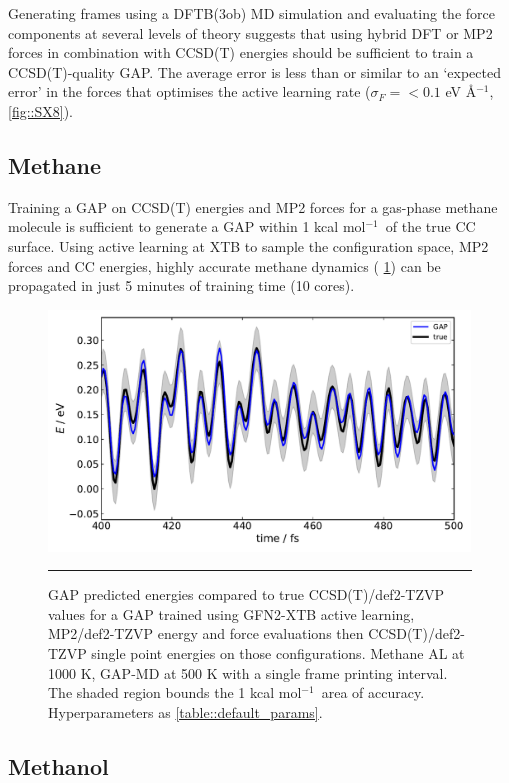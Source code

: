 \documentclass[11pt]{article}
\numberwithin{equation}{subsection}
\newcommand{\kcal}{kcal mol$^{-1}$}
\begin{document}
Generating frames using a DFTB(3ob) MD simulation and evaluating the force components at several levels of theory  suggests that using hybrid DFT or MP2 forces in combination with CCSD(T) energies should be sufficient to train a CCSD(T)-quality GAP. The average error is less than or similar to an `expected error' in the forces that optimises the active learning rate ($\sigma_F = <0.1$ eV \AA${}^{-1}$, \figurename{ \ref{fig::SX8}}). 


\subsection{Methane}
Training a GAP on CCSD(T) energies and MP2 forces for a gas-phase methane molecule is sufficient to generate a GAP within 1 \kcal~of the true CC surface. Using active learning at XTB to sample the configuration space, MP2 forces and CC energies, highly accurate methane dynamics (\figurename{ \ref{fig::SX10}}) can be propagated in just 5 minutes of training time (10 cores).


\begin{figure}[h!]
	\centering
	\vspace{0.4cm}
	\includegraphics[height=6.4cm]{figSX10.pdf}
	\vspace{0.1cm}
	\hrule
	\vspace{0.1cm}
	\caption{GAP predicted energies compared to true CCSD(T)/def2-TZVP values for a GAP trained using GFN2-XTB active learning, MP2/def2-TZVP energy and force evaluations then CCSD(T)/def2-TZVP single point energies on those configurations. Methane AL at 1000 K, GAP-MD at 500 K with a single frame printing interval. The shaded region bounds the 1 \kcal~area of accuracy. Hyperparameters as \tablename{ \ref{table::default_params}}.}
	\label{fig::SX10}
\end{figure}


\subsection{Methanol}
\end{document}
